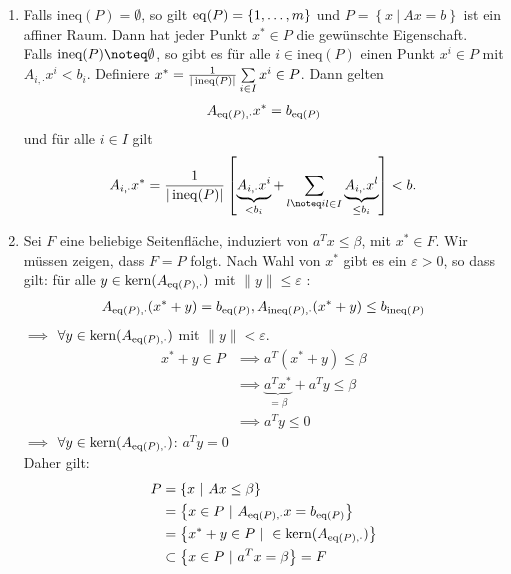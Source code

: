 \begin{beweis}
	\begin{enumerate}[label = (\alph*)]
	\item Falls $\text{ineq}(P) = \emptyset$, so gilt $\operatorname{eq}(P) = \left\{ 1,\dots ,m \right\}$ und $P=\left\{ x \ |\ Ax=b \right\}$ ist ein affiner Raum. Dann hat jeder Punkt $x^* \in P$ die gewünschte Eigenschaft.\\
		Falls  $\text{ineq}(P)\noteq\emptyset$, so gibt es für alle $i\in \text{ineq}(P)$ einen Punkt  $x^i \in P$ mit $A_{i,\cdot}x^i <b_{i}$. Definiere $x^* = \frac{1}{|\operatorname{ineq}(P)|}\sum\limits_{i \in I}^{} x^i \in P$. 
		Dann gelten 
		\begin{align*}
			A_{\operatorname{eq}(P),\cdot}x^* = b_{\operatorname{eq}(P)}
		\end{align*}
		und für alle $i \in I$ gilt
		\begin{align*}
			A_{i,\cdot} x^* = \frac{1}{|\ineq(P)|}\left[ \underbrace{A_{i,\cdot}x^i}_{< b_{i}} + \sum\limits_{l \noteq i\substack{l \in I}}^{} \underbrace{A_{i,\cdot}x^l}_{\leq b_{i}} \right] < b.
		\end{align*}
	\item Sei $F$ eine beliebige Seitenfläche, induziert von $a^{T} x \leq \beta$, mit $x^*\in F$.
		Wir müssen zeigen, dass $F=P$ folgt.
		Nach Wahl von $x^*$ gibt es ein $\varepsilon > 0$, so dass gilt: für alle $y\in \text{kern}(A_{\operatorname{eq}(P),\cdot})$ mit $ \|y\| \leq \varepsilon$ :
		\begin{align*}
			A_{\operatorname{eq}(P),\cdot}(x^*+y) = b_{\operatorname{eq}(P)}, A_{\operatorname{ineq}(P),\cdot}(x^*+y) \leq b_{\operatorname{ineq}(P)}
		\end{align*}
		$\implies$ $\forall y \in \text{kern}(A_{\operatorname{eq}(P),\cdot})$ mit  $\|y\| < \varepsilon$.
		 \begin{align*}
			 x^*+y \in P &\implies a^{T} (x^* +y) \leq \beta\\
						 &\implies \underbrace{a^{T} x^*}_{=\beta} + a^{T} y \leq \beta\\
						 &\implies a^{T} y \leq 0
		\end{align*}
		$\implies$ $\forall y \in \text{kern}(A_{\operatorname{eq}(P),\cdot})$: $a^{T} y =0$ \\
		Daher gilt:
		\begin{align*}
			P &= \left\{ x \ |\ Ax \leq \beta \right\} \\
			  &= \left\{x \in P \ |\ A_{\eq(P),\cdot}x= b_{\eq(P)} \right\}\\
			  &= \left\{x^* + y \in P \ | \  \in \text{kern}(A_{\eq(P),\cdot}) \right\}\\
			  &\subset \left\{ x \in P \ |\ a^{T} x = \beta  \right\} = F 

\end{align*}
\end{enumerate}
\end{beweis}

